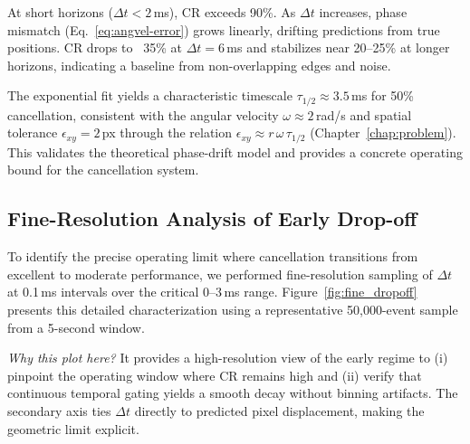 At short horizons ($\Delta t < 2$\,ms), CR exceeds 90\%. As $\Delta t$ increases, phase mismatch (Eq.~\eqref{eq:angvel-error}) grows linearly, drifting predictions from true positions. CR drops to ~35\% at $\Delta t=6$\,ms and stabilizes near 20--25\% at longer horizons, indicating a baseline from non-overlapping edges and noise.

The exponential fit yields a characteristic timescale $\tau_{1/2} \approx 3.5$\,ms for 50\% cancellation, consistent with the angular velocity $\omega \approx 2$\,rad/s and spatial tolerance $\epsilon_{xy}=2$\,px through the relation $\epsilon_{xy} \approx r\,\omega\,\tau_{1/2}$ (Chapter~\ref{chap:problem}). This validates the theoretical phase-drift model and provides a concrete operating bound for the cancellation system.

\subsection{Fine-Resolution Analysis of Early Drop-off}

To identify the precise operating limit where cancellation transitions from excellent to moderate performance, we performed fine-resolution sampling of $\Delta t$ at 0.1\,ms intervals over the critical 0--3\,ms range. Figure~\ref{fig:fine_dropoff} presents this detailed characterization using a representative 50,000-event sample from a 5-second window.

\noindent\textit{Why this plot here?} It provides a high-resolution view of the early regime to (i) pinpoint the operating window where CR remains high and (ii) verify that continuous temporal gating yields a smooth decay without binning artifacts. The secondary axis ties $\Delta t$ directly to predicted pixel displacement, making the geometric limit explicit.

